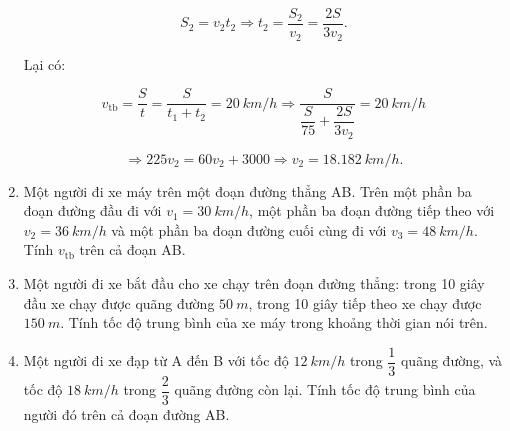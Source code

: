 \begin{enumerate}[label=\bfseries Bài \arabic*:]
{		$$S_2 = v_2t_2 \Rightarrow t_2 = \dfrac{S_2}{v_2} = \dfrac{2S}{3v_2}.$$
		
		Lại có:
		
		$$v_\text{tb} = \dfrac{S}{t} = \dfrac{S}{t_1+t_2} = \SI{20}{km/h} \Rightarrow \dfrac{S}{\dfrac{S}{75} + \dfrac{2S}{3v_2}} = \SI{20}{km/h}$$
		
		$$\Rightarrow 225 v_2 = 60 v_2 + 3000 \Rightarrow v_2 = \SI{18,182}{km/h}.$$
	}
	\item {}
	
	{
		
		Một người đi xe máy trên một đoạn đường thẳng AB. Trên một phần ba đoạn đường đầu đi với $v_1 = \SI{30}{km/h}$, một phần ba đoạn đường tiếp theo với $v_2 = \SI{36}{km/h}$ và một phần ba đoạn đường cuối cùng đi với $v_3= \SI{48}{km/h}$. Tính $v_\text{tb}$ trên cả đoạn AB.
		
	}
	\item {}
	
	{
		
		Một người đi xe bắt đầu cho xe chạy trên đoạn đường thẳng: trong 10 giây đầu xe chạy được quãng đường $\SI{50}{m}$, trong 10 giây tiếp theo xe chạy được $\SI{150}{m}$. Tính tốc độ trung bình của xe máy trong khoảng thời gian nói trên.
	}
	\item {}
	
	{
		
		Một người đi xe đạp từ A đến B với tốc độ $\SI{12}{km/h}$ trong $\dfrac{1}{3}$ quãng đường, và tốc độ $\SI{18}{km/h}$ trong $\dfrac{2}{3}$ quãng đường còn lại. Tính tốc độ trung bình của người đó trên cả đoạn đường AB.
	}
\end{enumerate}
